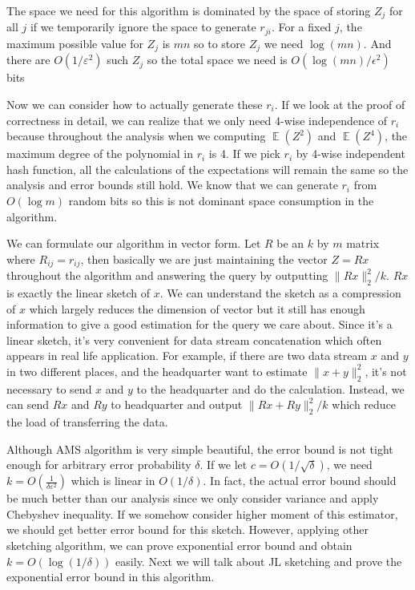 \documentclass[11pt]{article}
\DeclareMathOperator*{\E}{\mathbb{E}}
\newcommand{\eps}{\varepsilon}
\begin{document}
The space we need for this algorithm is dominated by the space of storing $Z_j$ for all $j$ if we temporarily ignore the space to generate $r_{ji}$. For a fixed $j$, the maximum possible value for $Z_j$ is $mn$ so to store $Z_j$ we need $\log(mn)$. And there are $O(1/\eps^2)$ such $Z_j$ so the total space we need is $O(\log(mn)/\epsilon^2)$ bits

Now we can consider how to actually generate these $r_{i}$. If we look at the proof of correctness in detail, we can realize that we only need 4-wise independence of $r_{i}$ because throughout the analysis when we computing $\E(Z^2)$ and $\E(Z^4)$, the maximum degree of the polynomial in $r_i$ is 4. If we pick $r_i$ by 4-wise independent hash function, all the calculations of the expectations will remain the same so the analysis and error bounds still hold. We know that we can generate $r_i$ from $O(\log m)$ random bits so this is not dominant space consumption in the algorithm.

We can formulate our algorithm in vector form. Let $R$ be an $k$ by $m$ matrix where $R_{ij} = r_{ij}$, then basically we are just maintaining the vector $Z = Rx$ throughout the algorithm and answering the query by outputting $\|Rx\|_2^2/k$. $Rx$ is exactly the linear sketch of $x$. We can understand the sketch as a compression of $x$ which largely reduces the dimension of vector but it still has enough information to give a good estimation for the query we care about. Since it's a linear sketch, it's very convenient for data stream concatenation which often appears in real life application. For example, if there are two data stream $x$ and $y$ in two different places, and the headquarter want to estimate $\|x + y\|_2^2$, it's not necessary to send $x$ and $y$ to the headquarter and do the calculation. Instead, we can send $Rx$ and $Ry$ to headquarter and output $\|Rx + Ry\|_2^2/k$ which reduce the load of transferring the data. 

Although AMS algorithm is very simple beautiful, the error bound is not tight enough for arbitrary error probability $\delta$. If we let $c = O(1/\sqrt{\delta})$, we need $k = O(\frac{1}{\delta \eps^2})$ which is linear in $O(1/\delta)$. In fact, the actual error bound should be much better than our analysis since we only consider variance and apply Chebyshev inequality. If we somehow consider higher moment of this estimator, we should get better error bound for this sketch. However, applying other sketching algorithm, we can prove exponential error bound and obtain $k = O(\log (1/\delta))$ easily. Next we will talk about JL sketching and prove the exponential error bound in this algorithm.
\end{document}
